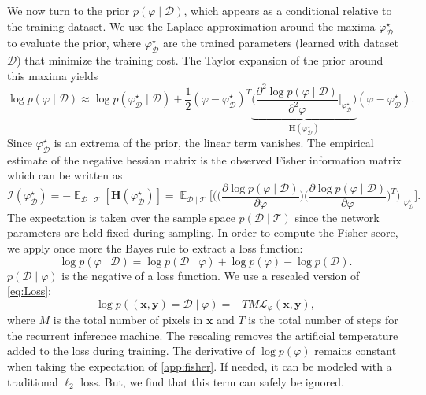 \documentclass[twocolumn]{aastex631}
\DeclareMathOperator{\EX}{\mathbb{E}}%
\begin{document}
We now turn to the prior $p(\varphi \mid \mathcal{D})$, which 
appears as a conditional relative to 
the training dataset. 
We use the Laplace approximation around the maxima $\varphi^{\star}_{\mathcal{D}}$ 
to evaluate the prior,
where $\varphi^{\star}_{\mathcal{D}}$ 
are the trained parameters (learned with dataset $\mathcal{D}$) 
that minimize the training cost. The Taylor expansion 
of the prior around this maxima yields
\begin{equation}\label{app:prior}
        \log p(\varphi \mid \mathcal{D}) \approx \log p(\varphi^{\star}_{\mathcal{D}} \mid \mathcal{D}) 
        + \frac{1}{2} (\varphi - \varphi^{\star}_{\mathcal{D}})^{T} 
        \underbrace{
        \bigg(
                \frac{\partial^2 \log p(\varphi \mid \mathcal{D})}{\partial^2 \varphi}\bigg|_{\varphi^{\star}_{\mathcal{D}}}
        \bigg)
}_{\displaystyle \mathbf{H}(\varphi^{\star}_{\mathcal{D}})}
        (\varphi - \varphi^{\star}_{\mathcal{D}}).
\end{equation} 
Since $\varphi^{\star}_{\mathcal{D}}$ is an extrema of the prior, the linear term vanishes. 
The empirical estimate of the negative hessian matrix is the observed Fisher information 
matrix which can be written as
\begin{equation}\label{app:fisher}
        \mathcal{I}(\varphi^{\star}_{\mathcal{D}}) = 
        -\EX_{\mathcal{D} \mid \mathcal{T}} [\mathbf{H}(\varphi^{\star}_{\mathcal{D}})] = 
        \EX_{\mathcal{D}\mid \mathcal{T}}
        \Bigg[
                \Bigg(
                \bigg( 
                        \frac{\partial \log p(\varphi \mid \mathcal{D})}{\partial \varphi}
                \bigg) 
                \bigg( 
                        \frac{\partial \log p(\varphi \mid \mathcal{D})}{\partial \varphi}
                \bigg)^{T}
        \Bigg)
\Bigg|_{\varphi^{\star}_{\mathcal{D}}}\Bigg].
\end{equation} 
The expectation is taken over the sample space $p(\mathcal{D} \mid \mathcal{T})$ since 
the network parameters are held fixed during sampling.
In order to compute the Fisher score, 
we apply once more the Bayes rule to extract a loss function:
\begin{equation} 
        \log p(\varphi \mid \mathcal{D}) = \log p(\mathcal{D}\mid \varphi) 
        + \log p(\varphi) - \log p(\mathcal{D}).
\end{equation} 
$p(\mathcal{D} \mid \varphi)$ is the negative of a loss function. 
We use a rescaled version of \eqref{eq:Loss}:
\begin{equation}\label{eq:LossFisher} 
        \log p((\mathbf{x},\mathbf{y}) = \mathcal{D} \mid \varphi) = -TM \mathcal{L}_{\varphi}(\mathbf{x},\mathbf{y}),
\end{equation} 
where $M$ is the total number of pixels in $\mathbf{x}$ and $T$ is the 
total number of steps for the recurrent inference machine.
The rescaling removes the artificial temperature added to the 
loss during training. 
The derivative of $\log p(\varphi)$ remains constant when taking 
the expectation of \eqref{app:fisher}. If needed, 
it can be modeled with a traditional $\ell_2$ loss. But, we find that 
this term can safely be ignored.
\end{document}
